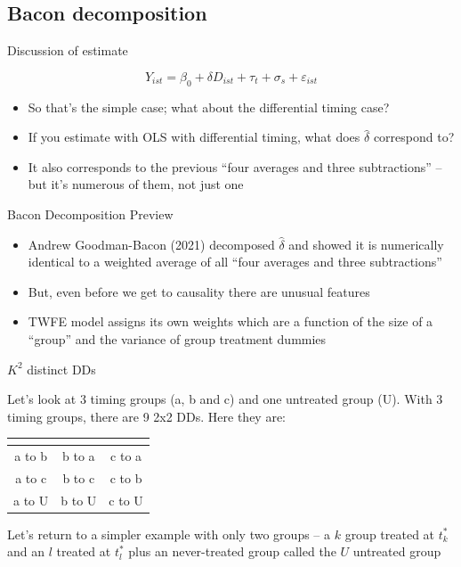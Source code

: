 \documentclass{beamer}
\begin{document}
\subsection{Bacon decomposition}

\begin{frame}{Discussion of estimate}


$$Y_{ist} = \beta_0 + \delta D_{ist} + \tau_t + \sigma_s + \varepsilon_{ist}$$


\begin{itemize}
\item So that's the simple case; what about the differential timing case?  

\item If you estimate with OLS with differential timing, what does $\widehat{\delta}$ correspond to?
\item It also corresponds to the previous ``four averages and three subtractions'' -- but it's numerous of them, not just one

\end{itemize}

\end{frame}



\begin{frame}{Bacon Decomposition Preview}


\begin{itemize}
\item Andrew Goodman-Bacon (2021) decomposed $\widehat{\delta}$ and showed it is numerically identical to a weighted average of all ``four averages and three subtractions''
\item But, even before we get to causality there are unusual features
\item TWFE model assigns its own weights which are a function of the size of a ``group'' and the variance of group treatment dummies
\end{itemize}

\end{frame}



\begin{frame}{$K^2$ distinct DDs}

Let's look at 3 timing groups (a, b and c) and one untreated group (U).  With 3 timing groups, there are 9 2x2 DDs.  Here they are:


\begin{center}
\begin{tabular}{c|c|c}
\multicolumn{1}{l}{} &
\multicolumn{1}{l}{} &
\multicolumn{1}{l}{} \\
\midrule
a to b & b to a & c to a \\
a to c & b to c & c to b \\
a to U & b to U & c to U \\
\midrule
\end{tabular}
\end{center}

\bigskip

Let's return to a simpler example with only two groups -- a $k$ group treated at $t_k^*$ and an $l$ treated at $t_l^*$ plus an never-treated group called the $U$ untreated group
\end{frame} 
\end{document}
